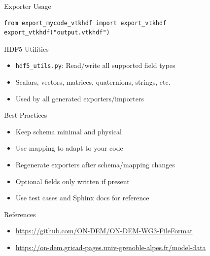 \documentclass{beamer}
\begin{document}
\begin{frame}[fragile]{Exporter Usage}
\begin{verbatim}
from export_mycode_vtkhdf import export_vtkhdf
export_vtkhdf("output.vtkhdf")
\end{verbatim}
\end{frame}

\begin{frame}{HDF5 Utilities}
  \begin{itemize}
    \item \texttt{hdf5\_utils.py}: Read/write all supported field types
    \item Scalars, vectors, matrices, quaternions, strings, etc.
    \item Used by all generated exporters/importers
  \end{itemize}
\end{frame}

\begin{frame}{Best Practices}
  \begin{itemize}
    \item Keep schema minimal and physical
    \item Use mapping to adapt to your code
    \item Regenerate exporters after schema/mapping changes
    \item Optional fields only written if present
    \item Use test cases and Sphinx docs for reference
  \end{itemize}
\end{frame}

\begin{frame}{References}
  \begin{itemize}
    \item \url{https://github.com/ON-DEM/ON-DEM-WG3-FileFormat}
    \item \url{https://on-dem.gricad-pages.univ-grenoble-alpes.fr/model-data}
  \end{itemize}
\end{frame}
\end{document}
